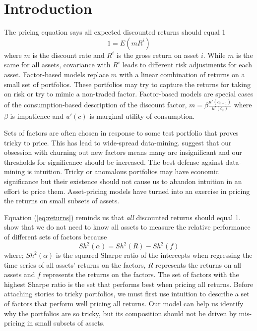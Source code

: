 
\section{Introduction}

The pricing equation says all expected discounted returns should equal 1
\begin{equation}
\label{eq:returns}
1=E(mR^i)
\end{equation}
where $m$ is the discount rate and $R^i$ is the gross return on asset $i$.
While $m$ is the same for all assets, covariance with $R^i$ leads to different 
risk adjustments for each asset.
Factor-based models replace $m$ with a linear combination of returns on 
a small set of portfolios. These portfolios may try to capture the returns for 
taking on risk or try to mimic a non-traded factor.
Factor-based models are special cases of the consumption-based description 
of the discount factor, $m=\beta\frac{u'(c_{t+1})}{u'(c_t)}$ where $\beta$ is 
impatience and $u'(c)$ is marginal utility of consumption.

Sets of factors are often chosen in response to some test portfolio that 
proves tricky to price.
This has lead to wide-spread data-mining.
\textcite{harvey2016and} suggest that our obsession with churning out new 
factors means many are insignificant and our thresholds for significance 
should be increased.
The best defense against data-mining is intuition.
Tricky or anomalous portfolios may have economic significance but their 
existence should not cause us to abandon intuition in an effort to price them.
Asset-pricing models have turned into an exercise in pricing the returns on 
small subsets of assets.

Equation (\ref{eq:returns}) reminds us that \emph{all} discounted returns 
should equal 1.
\textcite{barillas2016alpha} show that we do not need to know all assets to
measure the relative performance of different sets of factors because
\begin{equation}
\label{eq:maxsh}
Sh^2(\alpha) = Sh^2(R) - Sh^2(f)
\end{equation}
where; $Sh^2(\alpha)$ is the squared Sharpe ratio of the intercepts when 
regressing the time series of all assets' returns on the factors, $R$ 
represents the returns on all assets and $f$ represents the returns on the 
factors.
The set of factors with the highest Sharpe ratio is the set that performs best 
when pricing all returns.
Before attaching stories to tricky portfolios, we must first use intuition to 
describe a set of factors that perform well pricing all returns.
Our model can help us identify why the portfolios are so tricky, but its 
composition should not be driven by mis-pricing in small subsets of assets.

